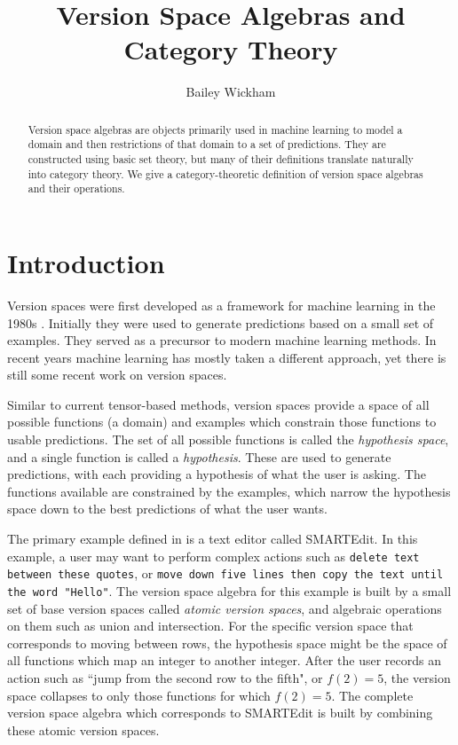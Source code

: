 \documentclass{article}
\title{Version Space Algebras and Category Theory}
\author{Bailey Wickham}
\theoremstyle{definition}
\begin{document}
\maketitle

\begin{abstract}
Version space algebras are objects primarily used in machine learning to model a domain and then restrictions of that domain to a set of predictions. They are constructed using basic set theory, but many of their definitions translate naturally into category theory. We give a category-theoretic definition of version space algebras and their operations. 
\end{abstract}

\section{Introduction}
Version spaces were first developed as a framework for machine learning in the 1980s \cite{original}. Initially they were used to generate predictions based on a small set of examples. They served as a precursor to modern machine learning methods. In recent years machine learning has mostly taken a different approach, yet there is still some recent work on version spaces. 

Similar to current tensor-based methods, version spaces provide a space of all possible functions (a domain) and examples which constrain those functions to usable predictions. The set of all possible functions is called the \textit{hypothesis space}, and a single function is called a \textit{hypothesis}. These are used to generate predictions, with each providing a hypothesis of what the user is asking. The functions available are constrained by the examples, which narrow the hypothesis space down to the best predictions of what the user wants.

The primary example defined in \cite{short} is a text editor called SMARTEdit. In this example, a user may want to perform complex actions such as \texttt{delete text between these quotes}, or \texttt{move down five lines then copy the text until the word "Hello"}. The version space algebra for this example is built by a small set of base version spaces called \textit{atomic version spaces}, and algebraic operations on them such as union and intersection. For the specific version space that corresponds to moving between rows, the hypothesis space might be the space of all functions which map an integer to another integer. After the user records an action such as ``jump from the second row to the fifth", or $f(2) = 5$, the version space collapses to only those functions for which $f(2) = 5$. The complete version space algebra which corresponds to SMARTEdit is built by combining these atomic version spaces.
\end{document}
